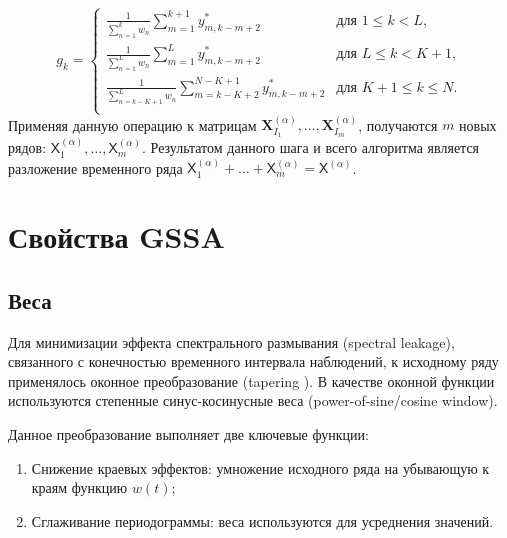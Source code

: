\documentclass[12pt, specialist, subf
]{disser}
\theoremstyle{definition}
\newcommand{\TS}{\mathsf{X}}
\begin{document}
\begin{equation*}
	g_{k}=
	\begin{cases}
		\frac{1}{\sum_{n = 1}^k w_n} \sum\limits_{m=1}^{k+1} y_{m,k-m+2}^{*}           &
		\text{для } 1 \leq k < L,                                                        \\

		\frac{1}{\sum_{n = 1}^L w_n} \sum\limits_{m=1}^{L} y_{m,k-m+2}^{*}             &
		\text{для } L \leq k < K+1 ,                                                     \\

		\frac{1}{\sum_{n = k-K+1}^L w_n} \sum\limits_{m=k-K+2}^{N-K+1} y_{m,k-m+2}^{*} &
		\text{для } K+1 \leq k \leq N .                                                  \\
	\end{cases}
\end{equation*}
Применяя данную операцию к матрицам $\mathbf{X}_{I_1}^{(\alpha)}, \dots, \mathbf{X}_{I_m}^{(\alpha)}$, получаются $m$ новых рядов: $\TS^{(\alpha)}_1, \dots, \TS^{(\alpha)}_m$.
Результатом данного шага и всего алгоритма является разложение временного ряда $\TS^{(\alpha)}_1 + \dots + \TS^{(\alpha)}_m = \TS^{(\alpha)}$.



\section{Свойства GSSA}

\subsection{Веса}

Для минимизации эффекта спектрального размывания (spectral leakage), связанного с конечностью временного интервала наблюдений, к исходному ряду применялось оконное преобразование (tapering \cite{weisstein2002crc}). В качестве оконной функции используются степенные синус-косинусные веса (power-of-sine/cosine window).

Данное преобразование выполняет две ключевые функции:
\begin{enumerate}
	\item Снижение краевых эффектов: умножение исходного ряда на убывающую к краям функцию \( w(t) \);
	\item Сглаживание периодограммы: веса используются для усреднения значений.
\end{enumerate}
\end{document}
